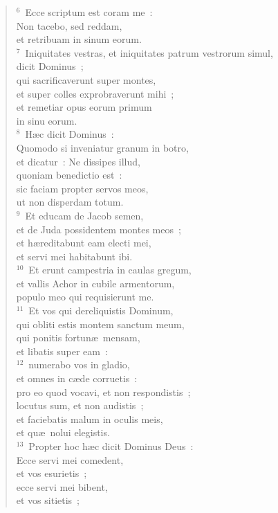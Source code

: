 \begin{flushleft}
\begin{verse}
${}^{6}$~Ecce scriptum est coram me~:\\ Non tacebo, sed reddam,\\ et retribuam in sinum eorum.\\
${}^{7}$~Iniquitates vestras, et iniquitates patrum vestrorum simul,\\ dicit Dominus~;\\ qui sacrificaverunt super montes,\\ et super colles exprobraverunt mihi~;\\ et remetiar opus eorum primum\\ in sinu eorum.\\
${}^{8}$~H\ae c dicit Dominus~:\\ Quomodo si inveniatur granum in botro,\\ et dicatur~: Ne dissipes illud,\\ quoniam benedictio est~:\\ sic faciam propter servos meos,\\ ut non disperdam totum.\\
${}^{9}$~Et educam de Jacob semen,\\ et de Juda possidentem montes meos~;\\ et h\ae reditabunt eam electi mei,\\ et servi mei habitabunt ibi.\\
${}^{10}$~Et erunt campestria in caulas gregum,\\ et vallis Achor in cubile armentorum,\\ populo meo qui requisierunt me.\\
${}^{11}$~Et vos qui dereliquistis Dominum,\\ qui obliti estis montem sanctum meum,\\ qui ponitis fortun\ae\ mensam,\\ et libatis super eam~:\\
${}^{12}$~numerabo vos in gladio,\\ et omnes in c\ae de corruetis~:\\ pro eo quod vocavi, et non respondistis~;\\ locutus sum, et non audistis~;\\ et faciebatis malum in oculis meis,\\ et qu\ae\ nolui elegistis.\\
${}^{13}$~Propter hoc h\ae c dicit Dominus Deus~:\\ Ecce servi mei comedent,\\ et vos esurietis~;\\ ecce servi mei bibent,\\ et vos sitietis~;\\

\end{verse}
\end{flushleft}
